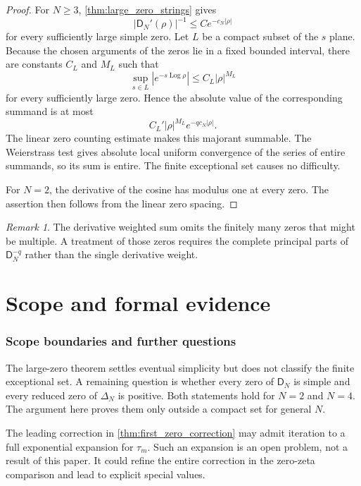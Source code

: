 \documentclass[11pt,letterpaper]{article}
\theoremstyle{definition}
\theoremstyle{remark}
\newtheorem{remark}[remark]{Remark}
\newcommand{\Dfun}{\mathsf D}
\newcommand{\Log}{\operatorname{Log}}
\begin{document}
\begin{proof}
For $N\geq3$, \cref{thm:large_zero_strings} gives
\[
|\Dfun_N'(\rho)|^{-1}
\leq
C e^{-c_N|\rho|}
\]
for every sufficiently large simple zero.  Let $L$ be a compact subset
of the $s$ plane.  Because the chosen arguments of the zeros lie in a
fixed bounded interval, there are constants $C_L$ and $M_L$ such that
\[
\sup_{s\in L}|e^{-s\Log\rho}|
\leq C_L|\rho|^{M_L}
\]
for every sufficiently large zero.  Hence the absolute value of the
corresponding summand is at most
\[
C_L'|\rho|^{M_L}e^{-q c_N|\rho|}.
\]
The linear zero counting estimate makes this majorant summable.  The
Weierstrass test gives absolute local uniform convergence of the
series of entire summands, so its sum is entire.  The finite exceptional
set causes no difficulty.

For $N=2$, the derivative of the cosine has modulus one at every zero.  The assertion then follows from the linear zero spacing.
\end{proof}

\begin{remark}\label{rem:multiple_zeros}
The derivative weighted sum omits the finitely many zeros that might be multiple.  A treatment of those zeros requires the complete principal parts of $\Dfun_N^{-q}$ rather than the single derivative weight.
\end{remark}

\clearpage\part{Scope and formal evidence}
\section{Scope boundaries and further questions}\label{sec:further_questions}

The large-zero theorem settles eventual simplicity but does not classify the
finite exceptional set. A remaining question is whether every zero of
$\Dfun_N$ is simple and every reduced zero of $\Delta_N$ is positive. Both
statements hold for $N=2$ and $N=4$. The argument here proves them only outside
a compact set for general $N$.

The leading correction in \cref{thm:first_zero_correction} may admit iteration
to a full exponential expansion for $\tau_m$. Such an expansion is an open
problem, not a result of this paper. It could refine the entire correction in
the zero-zeta comparison and lead to explicit special values.
\end{document}
